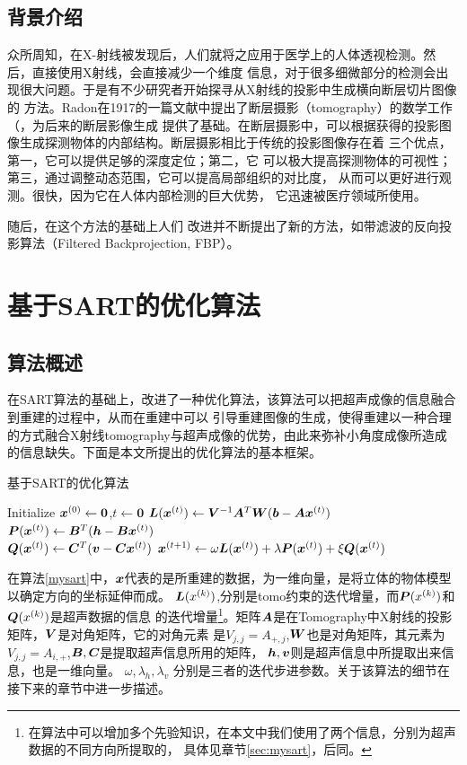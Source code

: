 \section{背景介绍}
众所周知，在X-射线被发现后，人们就将之应用于医学上的人体透视检测。然后，直接使用X射线，会直接减少一个维度
信息，对于很多细微部分的检测会出现很大问题。于是有不少研究者开始探寻从X射线的投影中生成横向断层切片图像的
方法。Radon在1917的一篇文献中提出了断层摄影（tomography）的数学工作（\cite{radon1986}，为后来的断层影像生成
提供了基础。在断层摄影中，可以根据获得的投影图像生成探测物体的内部结构。断层摄影相比于传统的投影图像存在着
三个优点，第一，它可以提供足够的深度定位；第二，它
可以极大提高探测物体的可视性；第三，通过调整动态范围，它可以提高局部组织的对比度，
从而可以更好进行观测。很快，因为它在人体内部检测的巨大优势，
它迅速被医疗领域所使用\cite{dobbins2003digital}。

随后，在这个方法的基础上人们
改进并不断提出了新的方法，如带滤波的反向投影算法（Filtered Backprojection, FBP）\cite{kak1979computerized}。

\chapter{基于SART的优化算法}
\section{算法概述}
在SART算法的基础上，改进了一种优化算法，该算法可以把超声成像的信息融合到重建的过程中，从而在重建中可以
引导重建图像的生成，使得重建以一种合理的方式融合X射线tomography与超声成像的优势，由此来弥补小角度成像所造成
的信息缺失。下面是本文所提出的优化算法的基本框架。
\begin{algo}\label{mysart}
基于SART的优化算法
\begin{algorithmic}[1]
\STATE
Initialize $\bm{ x}^{(0)} \leftarrow \bm{0}$,$t\leftarrow \bm{0}$
\REPEAT
\STATE
$\bm{L}(\bm{ x}^{(t)}) \leftarrow  \bm{ V}^{-1}\bm{ A}^T\bm{ W}(\bm{b}-\bm{ A}\bm{ x}^{(t)})$ \\
$\bm{P}(\bm{ x}^{(t)}) \leftarrow \bm{ B}^{T}(\bm{ h}-\bm{ B}\bm{ x}^{(t)})$ \\    %
$\bm{Q}(\bm{ x}^{(t)}) \leftarrow \bm{C}^{T}(\bm{ v}-\bm{C}\bm{ x}^{(t)})$         %
\STATE
$\bm{ x}^{(t+1)}\leftarrow \omega\bm{L}(\bm{ x}^{(t)}) + \lambda\bm{P}(\bm{ x}^{(t)}) + \xi\bm{Q}(\bm{ x}^{(t)})    $
\end{algorithmic}
\end{algo}

在算法\ref{mysart}中，$\bm{ x}$代表的是所重建的数据，为一维向量，是将立体的物体模型以确定方向的坐标延伸而成。
$\bm{L}(x^{(k)})$,分别是tomo约束的迭代增量，而$\bm{P}(x^{(k)})$和$ \bm{Q}(x^{(k)})$是超声数据的信息
的迭代增量\footnote{在算法中可以增加多个先验知识，在本文中我们使用了两个信息，分别为超声数据的不同方向所提取的，
具体见章节\ref{sec:mysart}，后同。}。矩阵$\bm{ A}$是在Tomography中X射线的投影矩阵，$\bm{ V}$是对角矩阵，它的对角元素
是$V_{j,j}=A_{+,j}$,$\bm{ W}$也是对角矩阵，其元素为$V_{j,j}=A_{i,+}$,$\bm{ B},\bm{C}$是提取超声信息所用的矩阵，
$\bm{ h},\bm{ v}$则是超声信息中所提取出来信息，也是一维向量。
$\omega,\lambda_h,\lambda_v$
分别是三者的迭代步进参数。关于该算法的细节在接下来的章节中进一步描述。
